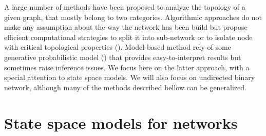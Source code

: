 \documentclass{svmult}
\begin{document}
A large number of methods have been proposed to analyze the topology of a given graph, that mostly belong to two categories. Algorithmic approaches do not make any assumption about the way the network has been build but propose efficient computational strategies to split it into sub-network or to isolate node with critical topological properties (\cite{NeG04}). Model-based method rely of some generative probabilistic model (\cite{PaR07}) that provides easy-to-interpret results but sometimes raise inference issues. We focus here on the latter approach, with a special attention to state space models. We will also focus on undirected binary network, although many of the methods described bellow can be generalized.


\section{State space models for networks}
\end{document}
